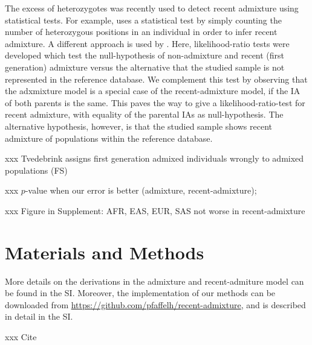 \documentclass[12pt]{article}
\theoremstyle{definition}
\begin{document}
The excess of heterozygotes was recently used to detect recent
admixture using statistical tests. For example, \cite{McNevin2019}
uses a statistical test by simply counting the number of heterozygous
positions in an individual in order to infer recent admixture. A
different approach is used by \cite{Tvedebrink2018a,
  Tvedebrink2018a}. Here, likelihood-ratio tests were developed which
test the null-hypothesis of non-admixture and recent (first
generation) admixture versus the alternative that the studied sample
is not represented in the reference database. We complement this test
by observing that the adxmixture model is a special case of the
recent-admixture model, if the IA of both parents is the same. This
paves the way to give a likelihood-ratio-test for recent admixture,
with equality of the parental IAs as null-hypothesis. The alternative
hypothesis, however, is that the studied sample shows recent admixture
of populations within the reference database.


xxx Tvedebrink assigns first generation admixed individuals wrongly to admixed populations (FS)

xxx $p$-value when our error is better (admixture, recent-admixture);

xxx Figure in Supplement: AFR, EAS, EUR, SAS not worse in
recent-admixture

\section{Materials and Methods}
\sloppy More details on the derivations in the admixture and
recent-admiture model can be found in the SI. Moreover, the
implementation of our methods can be downloaded from \url{
  https://github.com/pfaffelh/recent-admixture}, and is described in
detail in the SI.

xxx Cite \cite{Hanis1986}
\end{document}
